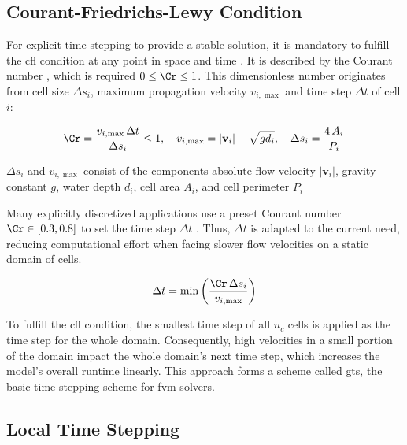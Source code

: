 \subsection{Courant-Friedrichs-Lewy Condition}\label{sec:CFL}

For explicit time stepping to provide a stable solution, it is mandatory to fulfill the \gls{cfl} condition at any point in space and time \autocite{simons2020}.
It is described by the Courant number \Cr, which is required $0 \leq \Cr \leq 1$.
This dimensionless number originates from cell size $\Delta s_i$, maximum propagation velocity $v_{i,\max}$ and time step $\Delta t$ of cell $i$:

\begin{equation}\label{eq:cfl}
	\Cr = \frac{v_{i, \max} \, \Delta t}{\Delta s_i} \leq 1, \quad
	v_{i, \max} = |\mathbf{v}_i| + \sqrt{g d_i}, \quad
	\Delta s_i = \frac{4 \, A_i}{P_i}
\end{equation}

$\Delta s_i$ and $v_{i,\max}$ consist of the components
absolute flow velocity $|\mathbf{v}_i|$,
gravity constant $g$,
water depth $d_i$,
cell area $A_i$, and
cell perimeter $P_i$

Many explicitly discretized applications use a preset Courant number $\Cr \in [0.3, 0.8]$ to set the time step $\Delta t$ 
\autocite{dazzi2018,hu2019,sanders2008,simons2020,steffen2023}.
Thus, $\Delta t$ is adapted to the current need, reducing computational effort when facing slower flow velocities on a static domain of cells.

\begin{equation}\label{eq:cfl-time-step}
	\Delta t = \min \left( \frac{\Cr \, \Delta s_i}{v_{i, \max}} \right)
\end{equation}


To fulfill the \gls{cfl} condition, the smallest time step of all $n_c$ cells is applied as the time step for the whole domain.
Consequently, high velocities in a small portion of the domain impact the whole domain's next time step, which increases the model's overall runtime linearly.
This approach forms a scheme called \gls{gts}, the basic time stepping scheme for \gls{fvm} solvers.

\subsection{Local Time Stepping}\label{sec:LTS}

